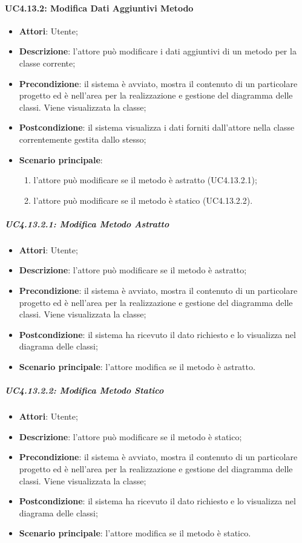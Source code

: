 \paragraph{UC4.13.2: Modifica Dati Aggiuntivi Metodo}
\label{UC4.13.2}
\begin{itemize}
	\item \textbf{Attori}: Utente;
	\item \textbf{Descrizione}: l'attore può modificare i dati aggiuntivi di un metodo per la classe corrente;
	\item \textbf{Precondizione}:  il sistema è avviato, mostra il contenuto di un particolare progetto ed è nell'area per la realizzazione e gestione del diagramma delle classi. Viene visualizzata la classe;
	\item \textbf{Postcondizione}: il sistema visualizza i dati forniti dall'attore nella classe correntemente gestita dallo stesso;
	\item \textbf{Scenario principale}:
	\begin{enumerate}
		\item l'attore può modificare se il metodo è astratto (UC4.13.2.1);
		\item l'attore può modificare se il metodo è statico (UC4.13.2.2).
	\end{enumerate}
\end{itemize}

\subparagraph{UC4.13.2.1: Modifica Metodo Astratto}
\label{UC4.13.2.1}
\begin{itemize}
	\item \textbf{Attori}: Utente;
	\item \textbf{Descrizione}: l'attore può modificare se il metodo è astratto;
	\item \textbf{Precondizione}: il sistema è avviato, mostra il contenuto di un particolare progetto ed è nell'area per la realizzazione e gestione del diagramma delle classi. Viene visualizzata la classe;
	\item \textbf{Postcondizione}: il sistema ha ricevuto il dato richiesto e lo visualizza nel diagrama delle classi;
	\item \textbf{Scenario principale}: l'attore modifica se il metodo è astratto.
\end{itemize}

\subparagraph{UC4.13.2.2: Modifica Metodo Statico}
\label{UC4.13.2.2}
\begin{itemize}
	\item \textbf{Attori}: Utente;
	\item \textbf{Descrizione}: l'attore può modificare se il metodo è statico;
	\item \textbf{Precondizione}: il sistema è avviato, mostra il contenuto di un particolare progetto ed è nell'area per la realizzazione e gestione del diagramma delle classi. Viene visualizzata la classe;
	\item \textbf{Postcondizione}: il sistema ha ricevuto il dato richiesto e lo visualizza nel diagrama delle classi;
	\item \textbf{Scenario principale}: l'attore modifica se il metodo è statico.
\end{itemize}

